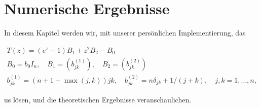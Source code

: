 \chapter{Numerische Ergebnisse}

In diesem Kapitel werden wir, mit unserer persönlichen Implementierung, das 

\begin{gather*}
    T(z) = (e^z - 1) B_1 + z^2 B_2 - B_0 \\
    B_0 = b_0 I_n,
    \quad
    B_1 = (b_{j k}^{(1)}),
    \quad
    B_2 = (b_{j k}^{(2)}) \\
    b_{j k}^{(1)} = (n + 1 - \max(j, k)) j k,
    \quad
    b_{j k}^{(2)} = n \delta_{j k} + 1 / (j + k),
    \quad
    j, k = 1, \dots, n,
\end{gather*}

us \cite{saad2020rational} lösen, und die theoretischen Ergebnisse veranschaulichen.
